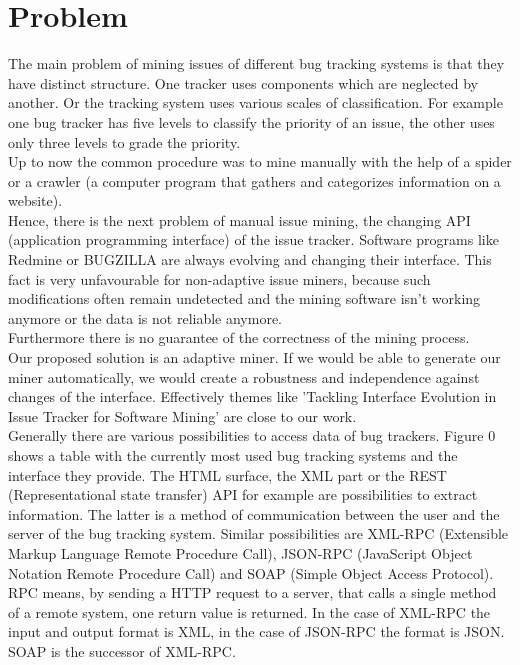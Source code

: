\section{Problem}
\label{Problem}
The main problem of mining issues of different bug tracking systems is that they have distinct structure. One tracker uses components which are neglected by another. Or the tracking system uses various scales of classification. For example one bug tracker has five levels to classify the priority of an issue, the other uses only three levels to grade the priority. \\Up to now the common procedure was to mine manually with the help of a spider or a crawler (a computer program that gathers and categorizes information on a website). 
\\
 Hence, there is the next problem of manual issue mining, the changing API (application programming interface) of the issue tracker. Software programs like Redmine or BUGZILLA are always evolving and changing their interface. This fact is very unfavourable for non-adaptive issue miners, because such modifications often remain undetected and the mining software isn't working anymore or the data is not reliable anymore.\\
Furthermore there is no guarantee of the correctness of the mining process. \\ Our proposed solution is an adaptive miner. If we would be able to generate our miner automatically, we would create a robustness and independence against changes of the interface. Effectively themes like 'Tackling Interface Evolution in Issue Tracker for Software Mining' are close to our work. \\
Generally there are various possibilities to access data of bug trackers. Figure 0 shows a table with the currently most used bug tracking systems and the interface they provide.
The HTML surface, the XML part or the REST (Representational state transfer) API for example are possibilities to extract information. The latter is a method of communication between the user and the server of the bug tracking system. Similar possibilities are XML-RPC (Extensible Markup Language Remote Procedure Call), JSON-RPC (JavaScript Object Notation Remote Procedure Call) and SOAP (Simple Object Access Protocol). RPC means, by sending a HTTP request to a server, that calls a single method of a remote system, one return value is returned. In the case of XML-RPC the input and output format is XML, in the case of JSON-RPC the format is JSON. SOAP is the successor of XML-RPC.  \\

